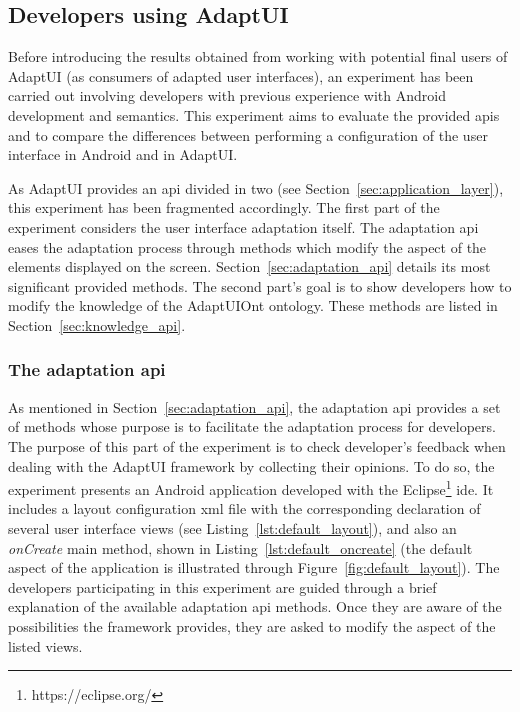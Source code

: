 \subsection{Developers using AdaptUI}
\label{sec:developers}

Before introducing the results obtained from working with potential final users
of AdaptUI (as consumers of adapted user interfaces), an experiment has been
carried out involving developers with previous experience with Android development
and semantics. This experiment aims to evaluate the provided \acp{api} and to 
compare the differences between performing a configuration of the user interface 
in Android and in AdaptUI. 

As AdaptUI provides an \ac{api} divided in two (see Section~\ref{sec:application_layer}), 
this experiment has been fragmented accordingly. The first part of the experiment 
considers the user interface adaptation itself. The adaptation \ac{api} eases the 
adaptation process through methods which modify the aspect of the elements 
displayed on the screen. Section~\ref{sec:adaptation_api} details its most 
significant provided methods. The second part's goal is to show developers how 
to modify the knowledge of the AdaptUIOnt ontology. These methods are listed in 
Section~\ref{sec:knowledge_api}.

\subsubsection{The adaptation \ac{api}}
\label{sec:adaptation_api_experiment}

As mentioned in Section~\ref{sec:adaptation_api}, the adaptation \ac{api} provides 
a set of methods whose purpose is to facilitate the adaptation process for 
developers. The purpose of this part of the experiment is to check developer's 
feedback when dealing with the AdaptUI framework by collecting their opinions.
To do so, the experiment presents an Android application developed with the 
Eclipse\footnote{https://eclipse.org/} \ac{ide}. It includes a layout configuration 
\ac{xml} file with the corresponding declaration of several user interface views
(see Listing~\ref{lst:default_layout}), and also an \textit{onCreate} main method, 
shown in Listing~\ref{lst:default_oncreate} (the default aspect of the application
is illustrated through Figure~\ref{fig:default_layout}). The developers 
participating in this experiment are guided through a brief explanation of the 
available adaptation \ac{api} methods. Once they are aware of the possibilities 
the framework provides, they are asked to modify the aspect of the listed views.

